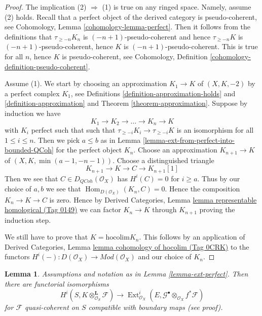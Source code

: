 \documentclass{amsart}
\theoremstyle{plain}
\newtheorem{lemma}[subsection]{Lemma}
\theoremstyle{definition}
\theoremstyle{remark}
\numberwithin{equation}{subsection}
\def\Hom{\mathop{\mathrm{Hom}}\nolimits}
\def\Ext{\mathop{\mathrm{Ext}}\nolimits}
\def\QCoh{\mathit{QCoh}}
\begin{document}
\begin{proof}
The implication (2) $\Rightarrow$ (1) is true on any ringed space.
Namely, assume (2) holds. Recall that a perfect object of the derived
category is pseudo-coherent, see
Cohomology, Lemma \ref{cohomology-lemma-perfect}.
Then it follows from the definitions that
$\tau_{\geq -n}K_n$ is $(-n + 1)$-pseudo-coherent
and hence $\tau_{\geq -n}K$ is $(-n + 1)$-pseudo-coherent,
hence $K$ is $(-n + 1)$-pseudo-coherent. This is true for
all $n$, hence $K$ is pseudo-coherent, see
Cohomology, Definition \ref{cohomology-definition-pseudo-coherent}.

\medskip\noindent
Assume (1). We start by choosing an approximation
$K_1 \to K$ of $(X, K, -2)$ by a perfect complex $K_1$, see
Definitions \ref{definition-approximation-holds} and
\ref{definition-approximation} and
Theorem \ref{theorem-approximation}.
Suppose by induction we have
$$
K_1 \to K_2 \to \ldots \to K_n \to K
$$
with $K_i$ perfect such that
such that $\tau_{\geq -i}K_i \to \tau_{\geq -i}K$ is an isomorphism
for all $1 \leq i \leq n$. Then we pick $a \leq b$ as in
Lemma \ref{lemma-ext-from-perfect-into-bounded-QCoh}
for the perfect object $K_n$. Choose an approximation
$K_{n + 1} \to K$ of $(X, K, \min(a - 1, -n - 1))$.
Choose a distinguished triangle
$$
K_{n + 1} \to K \to C \to K_{n + 1}[1]
$$
Then we see that $C \in D_\QCoh(\mathcal{O}_X)$ has
$H^i(C) = 0$ for $i \geq a$. Thus by our choice of $a, b$
we see that $\Hom_{D(\mathcal{O}_X)}(K_n, C) = 0$.
Hence the composition $K_n \to K \to C$ is zero. Hence by
Derived Categories, Lemma \href{https://stacks.math.columbia.edu/tag/0149}{lemma representable homological (Tag 0149)}
we can factor $K_n \to K$ through $K_{n + 1}$
proving the induction step.

\medskip\noindent
We still have to prove that $K = \text{hocolim} K_n$.
This follows by an application of
Derived Categories, Lemma \href{https://stacks.math.columbia.edu/tag/0CRK}{lemma cohomology of hocolim (Tag 0CRK)}
to the functors
$H^i( - ) : D(\mathcal{O}_X) \to \textit{Mod}(\mathcal{O}_X)$
and our choice of $K_n$.
\end{proof}


\begin{lemma}
\label{lemma-compute-ext-perfect}
Assumptions and notation as in Lemma \ref{lemma-ext-perfect}.
Then there are functorial isomorphisms
$$
H^i(S, K \otimes^\mathbf{L}_{\mathcal{O}_S} \mathcal{F})
\longrightarrow
\Ext^i_{\mathcal{O}_X}(E,
\mathcal{G}^\bullet \otimes_{\mathcal{O}_X} f^*\mathcal{F})
$$
for $\mathcal{F}$ quasi-coherent on $S$
compatible with boundary maps (see proof).
\end{lemma}
\end{document}
